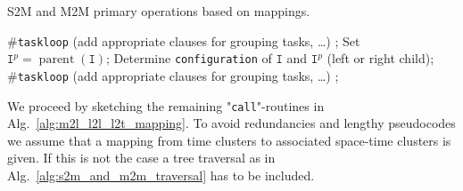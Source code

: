 \documentclass[a4paper,11pt]{article}
\theoremstyle{plain}
\theoremstyle{definition}
\theoremstyle{remark}
\DeclareMathOperator{\parent}{parent}
\begin{document}
\begin{algorithm}
  \caption{S2M and M2M primary operations based on mappings.} \label{alg:s2m_and_m2m_mapping}
  \begin{algorithmic}[1] 
    \State \#\texttt{taskloop} (add appropriate clauses for grouping tasks, \ldots)
        \State {};
      \EndFor
    \EndFunction
    \Statex
      \State Set $\texttt{I}^p = \parent(\texttt{I})$;
      \State Determine \texttt{configuration} of $\texttt{I}$ and $\texttt{I}^p$ (left or right child);
      \State \#\texttt{taskloop} (add appropriate clauses for grouping tasks, \ldots)
        \State {};
      \EndFor
    \EndFunction
  \end{algorithmic}
\end{algorithm}

We proceed by sketching the remaining "\texttt{call}"-routines in Alg.~\ref{alg:m2l_l2l_l2t_mapping}. To avoid redundancies and lengthy pseudocodes we assume that a mapping from time clusters to associated space-time clusters is given. If this is not the case a tree traversal as in Alg.~\ref{alg:s2m_and_m2m_traversal} has to be included.
\end{document}
